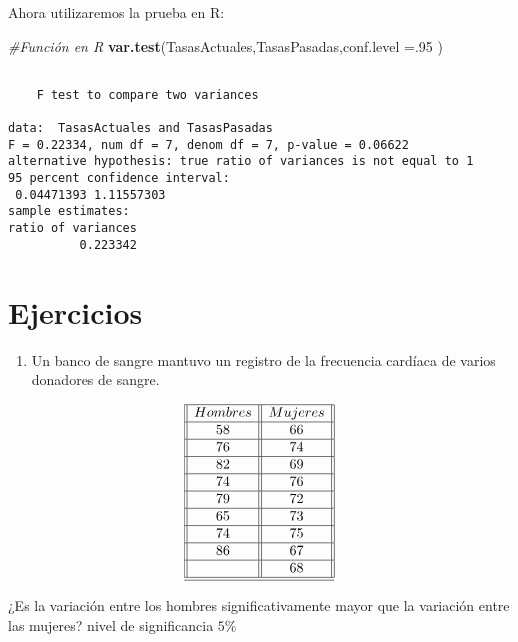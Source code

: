 \documentclass[a4paper,oneside,openany]{book}
\newenvironment{Shaded}{\begin{snugshade}}{\end{snugshade}}
\newcommand{\KeywordTok}[1]{\textcolor[rgb]{0.13,0.29,0.53}{\textbf{#1}}}
\newcommand{\DataTypeTok}[1]{\textcolor[rgb]{0.13,0.29,0.53}{#1}}
\newcommand{\DecValTok}[1]{\textcolor[rgb]{0.00,0.00,0.81}{#1}}
\newcommand{\CommentTok}[1]{\textcolor[rgb]{0.56,0.35,0.01}{\textit{#1}}}
\newcommand{\NormalTok}[1]{#1}
\providecommand{\tightlist}{%
  \setlength{\itemsep}{0pt}\setlength{\parskip}{0pt}}
\begin{document}
Ahora utilizaremos la prueba en R:

\begin{Shaded}
\begin{Highlighting}[]
\CommentTok{#Función en R}
\KeywordTok{var.test}\NormalTok{(TasasActuales,TasasPasadas,}\DataTypeTok{conf.level =}\NormalTok{.}\DecValTok{95}\NormalTok{ )}
\end{Highlighting}
\end{Shaded}

\begin{verbatim}

    F test to compare two variances

data:  TasasActuales and TasasPasadas
F = 0.22334, num df = 7, denom df = 7, p-value = 0.06622
alternative hypothesis: true ratio of variances is not equal to 1
95 percent confidence interval:
 0.04471393 1.11557303
sample estimates:
ratio of variances 
          0.223342 
\end{verbatim}

\section{Ejercicios}\label{ejercicios-7}

\begin{enumerate}
\def\labelenumi{\arabic{enumi}.}
\tightlist
\item
  Un banco de sangre mantuvo un registro de la frecuencia cardíaca de
  varios donadores de sangre.
\end{enumerate}

\[
\begin{equation*}
\begin{array}{||c| |c||} 
\hline 
Hombres& Mujeres \\  
 \hline
58&66\\
 \hline
76&74\\
 \hline
82&69\\
 \hline
74&76\\
 \hline
79&72\\
 \hline
65&73\\
 \hline
74&75\\
 \hline
86&67\\
 \hline
&68\\
 \hline
\hline
\end{array}
\end{equation*}
\]

¿Es la variación entre los hombres significativamente mayor que la
variación entre las mujeres? nivel de significancia \(5\%\)
\end{document}
